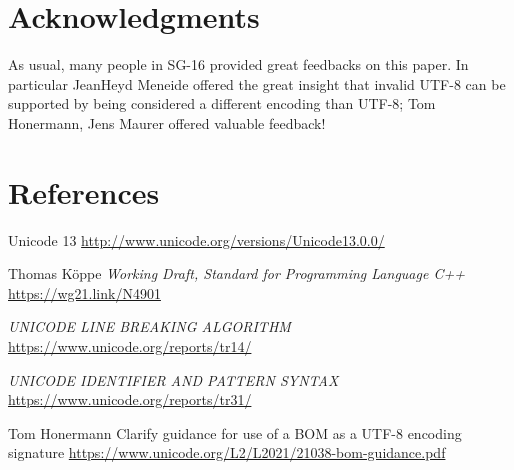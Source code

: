 \documentclass{wg21}
\begin{document}
\section{Acknowledgments}

As usual, many people in SG-16 provided great feedbacks on this paper.
In particular JeanHeyd Meneide offered the great insight that invalid UTF-8 can be supported by being considered a different encoding than UTF-8; Tom Honermann, Jens Maurer offered valuable feedback!


\section{References}
\renewcommand{\section}[2]{}%



\begin{thebibliography}{9}


Unicode 13\newline
\url{http://www.unicode.org/versions/Unicode13.0.0/}

Thomas Köppe
\emph{Working Draft, Standard for Programming Language C++}\newline
\url{https://wg21.link/N4901}

\emph{UNICODE LINE BREAKING ALGORITHM}\newline
\url{https://www.unicode.org/reports/tr14/}

\emph{UNICODE IDENTIFIER AND PATTERN SYNTAX}\newline
\url{https://www.unicode.org/reports/tr31/}

Tom Honermann
Clarify guidance for use of a BOM as a UTF-8 encoding signature
\url{https://www.unicode.org/L2/L2021/21038-bom-guidance.pdf}
    

\end{thebibliography}
\end{document}
